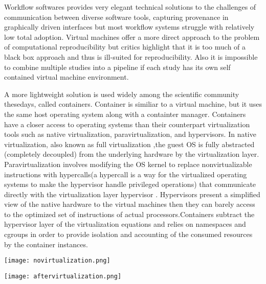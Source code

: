 Workflow softwares provides very elegant technical solutions to the challenges of communication between diverse software tools, capturing provenance in graphically driven interfaces but most workflow systems struggle with relatively low total adoption. Virtual machines offer a more direct approach to the problem of computational reproducibility but critics highlight that it is too much of a black box approach and thus is ill-suited for reproducibility. Also it is impossible to combine multiple studies into a pipeline if each study has its own self contained virtual machine environment\cite{Boettiger:2015:IDR:2723872.2723882}.

A more lightweight solution is used widely among the scientific community thesedays, called containers. Container is similiar to a virtual machine, but it uses the same host operating system along with a containter manager. Containers have a closer access to operating systems than their counterpart virtualization tools such as native virtualization, paravirtualization, and hypervisors. In native virtualization, also known as full virtualization ,the guest OS is fully abstracted (completely decoupled) from the underlying hardware by the virtualization layer. Paravirtualization involves modifying the OS kernel to replace nonvirtualizable instructions with hypercalls(a hypercall is a way for the virtualized operating systems to make the hypervisor handle privileged operations) that communicate directly with the virtualization layer hypervisor \cite{citeulike:11530382}. Hypervisors present a simplified view of the native hardware to the virtual machines then they can barely access to the optimized set of instructions of actual processors.Containers subtract the hypervisor layer of the virtualization equations and relies on namespaces and cgroups in order to provide isolation and accounting of the consumed resources by the container instances.

\begin{center}
\begin{minipage}{0.48\linewidth}
\texttt{[image: novirtualization.png]}
\label{fig:novirtualization}
\end{minipage}%
\hfill
\begin{minipage}{0.49\linewidth}
\texttt{[image: aftervirtualization.png]}
\label{fig:aftervirtualization}
\end{minipage}
\end{center}


